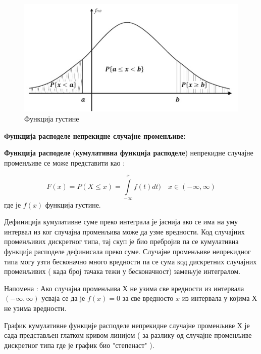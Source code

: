 \begin{figure}[H]
    \centering
\captionsetup{justification=centering}
   \includegraphics[scale=0.8]{./Slike/slika15.png} 
	\caption{Функција густине} 
	\label{fig:slika13}
\end{figure}


\textbf{Функција расподеле непрекидне случајне 
променљиве:}



\begin{de}
\textbf{Функција расподеле} (\textbf{кумулативна функција расподеле}) непрекидне случајне променљиве се може представити као :

$$
F(x) = P (X \leq x) = \int \limits_{-\infty}^{x} f(t)dt) \quad x \in (-\infty,\infty) 
$$
где је $f(x)$ функција густине.
\end{de}

Дефиниција кумулативне суме  преко интеграла је јаснија ако се има на уму интервал из ког случајна променљива може да узме вредности. Код случајних променљивих дискретног типа, тај скуп је био пребројив па се кумулативна функција расподеле дефинисала преко суме. Случајне променљиве непрекидног типа могу узти бесконачно много вредности па се сума код дискретних случајних променљивих ( када број тачака тежи у бесконачност) замењује интегралом.

Напомена : Ако случајна променљива Х не узима све вредности из интервала $ (-\infty,\infty) $ усваја се да је $f(x) = 0$ за све вредносто $x$ из интервала у којима Х не узима вредности.

График кумулативне функције расподеле непрекидне случајне променљиве Х је сада представљен глатком кривом линијом ( за разлику од случајне променљиве дискретног типа где је график био "степенаст" ).


